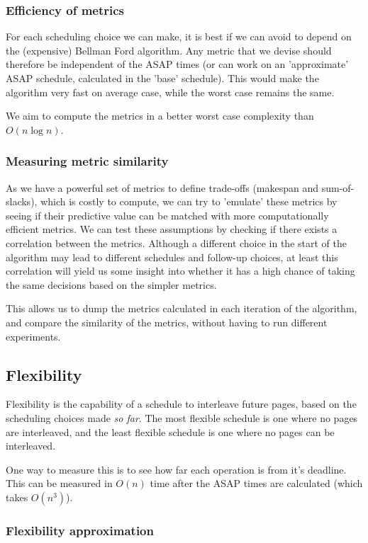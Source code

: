 \documentclass[]{article}
\begin{document}
\subsubsection{Efficiency of metrics}
For each scheduling choice we can make, it is best if we can avoid to depend on the (expensive) Bellman Ford algorithm. Any metric that we devise should therefore be independent of the ASAP times (or can work on an 'approximate' ASAP schedule, calculated in the 'base' schedule). This would make the algorithm very fast on average case, while the worst case remains the same.

We aim to compute the metrics in a better worst case complexity than $O(n \log n)$.

\subsubsection{Measuring metric similarity}
As we have a powerful set of metrics to define trade-offs (makespan and sum-of-slacks), which is costly to compute, we can try to 'emulate' these metrics by seeing if their predictive value can be matched with more computationally efficient metrics. We can test these assumptions by checking if there exists a correlation between the metrics. Although a different choice in the start of the algorithm may lead to different schedules and follow-up choices, at least this correlation will yield us some insight into whether it has a high chance of taking the same decisions based on the simpler metrics.

This allows us to dump the metrics calculated in each iteration of the algorithm, and compare the similarity of the metrics, without having to run different experiments.


\subsection{Flexibility}
Flexibility is the capability of a schedule to interleave future pages, based on the scheduling choices made \textit{so far}. The most flexible schedule is one where no pages are interleaved, and the least flexible schedule is one where no pages can be interleaved.

One way to measure this is to see how far each operation is from it's deadline. This can be measured in $O(n)$ time after the ASAP times are calculated (which takes $O(n^3)$).

\subsubsection{Flexibility approximation}
\end{document}
